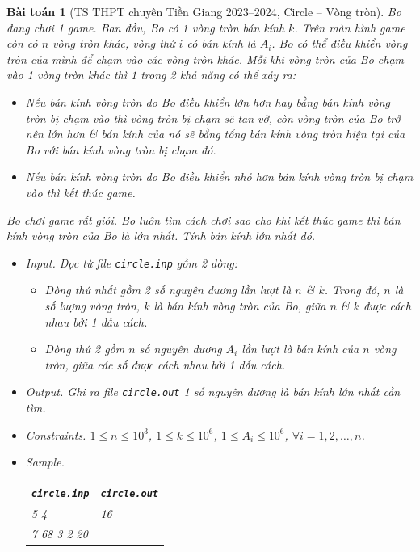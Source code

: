 \documentclass{article}
\newtheorem{baitoan}{Bài toán}
\begin{document}
\begin{baitoan}[TS THPT chuyên Tiền Giang 2023--2024, Circle -- Vòng tròn]
	Bo đang chơi 1 game. Ban đầu, Bo có 1 vòng tròn bán kính $k$. Trên màn hình game còn có $n$ vòng tròn khác, vòng thứ $i$ có bán kính là $A_i$. Bo có thể điều khiển vòng tròn của mình để chạm vào các vòng tròn khác. Mỗi khi vòng tròn của Bo chạm vào 1 vòng tròn khác thì 1 trong 2 khả năng có thể xảy ra:
	\begin{itemize}
		\item Nếu bán kính vòng tròn do Bo điều khiển lớn hơn hay bằng bán kính vòng tròn bị chạm vào thì vòng tròn bị chạm sẽ tan vỡ, còn vòng tròn của Bo trở nên lớn hơn \& bán kính của nó sẽ bằng tổng bán kính vòng tròn hiện tại của Bo với bán kính vòng tròn bị chạm đó.
		\item Nếu bán kính vòng tròn do Bo điều khiển nhỏ hơn bán kính vòng tròn bị chạm vào thì kết thúc game.
	\end{itemize}
	Bo chơi game rất giỏi. Bo luôn tìm cách chơi sao cho khi kết thúc game thì bán kính vòng tròn của Bo là lớn nhất. Tính bán kính lớn nhất đó.
	\begin{itemize}
		\item {\sf Input.} Đọc từ file \verb|circle.inp| gồm 2 dòng:
		\begin{itemize}
			\item Dòng thứ nhất gồm 2 số nguyên dương lần lượt là $n$ \& $k$. Trong đó, $n$ là số lượng vòng tròn, $k$ là bán kính vòng tròn của Bo, giữa $n$ \& $k$ được cách nhau bởi 1 dấu cách.
			\item Dòng thứ 2 gồm $n$ số nguyên dương $A_i$ lần lượt là bán kính của $n$ vòng tròn, giữa các số được cách nhau bởi 1 dấu cách.
		\end{itemize}
		\item {\sf Output.} Ghi ra file \verb|circle.out| 1 số nguyên dương là bán kính lớn nhất cần tìm.
		\item {\sf Constraints.} $1\le n\le10^3$, $1\le k\le10^6$, $1\le A_i\le10^6$, $\forall i = 1,2,\ldots,n$.
		\item {\sf Sample.}
		\begin{table}[H]
			\centering
			\begin{tabular}{|l|l|}
				\hline
				{\tt circle.inp} & {\tt circle.out} \\
				\hline
				5 4 & 16 \\
				\hline
				7 68 3 2 20 & \\
				\hline
			\end{tabular}
		\end{table}

\end{itemize}
\end{baitoan}
\end{document}
